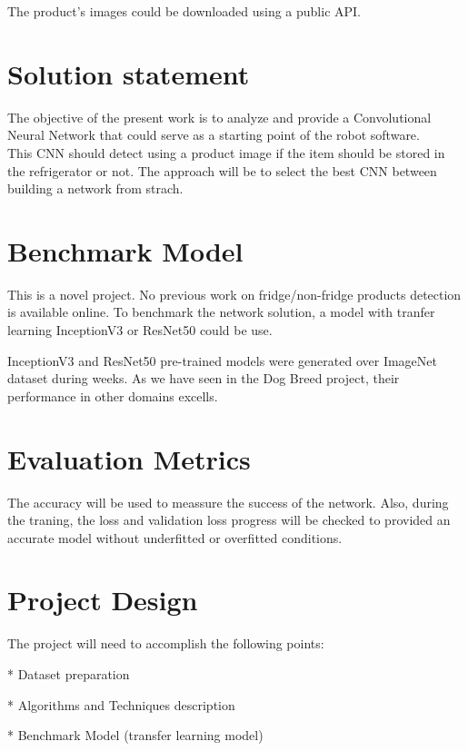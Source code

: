 \documentclass[a4paper,10pt]{report}
\begin{document}
The product's images could be downloaded using a public API.


\section{Solution statement}

The objective of the present work is to analyze and provide a Convolutional Neural Network that could serve as a starting point of the robot software.\\

This CNN should detect using a product image if the item should be stored in the refrigerator or not. The approach will be to select the best CNN between building a network from strach.\\

\section{Benchmark Model}

This is a novel project. No previous work on fridge/non-fridge products detection is available online. To benchmark the network solution, a model with tranfer learning InceptionV3 or ResNet50 could be use.

InceptionV3 and ResNet50 pre-trained models were generated over ImageNet dataset during weeks. As we have seen in the Dog Breed project, their performance in other domains excells. 

\section{Evaluation Metrics}

The accuracy will be used to meassure the success of the network. Also, during the traning, the loss and validation loss progress will be checked to provided an accurate model without underfitted or overfitted conditions.\\


\section{Project Design}

The project will need to accomplish the following points:

* Dataset preparation

* Algorithms and Techniques description

* Benchmark Model (transfer learning model)
\end{document}
